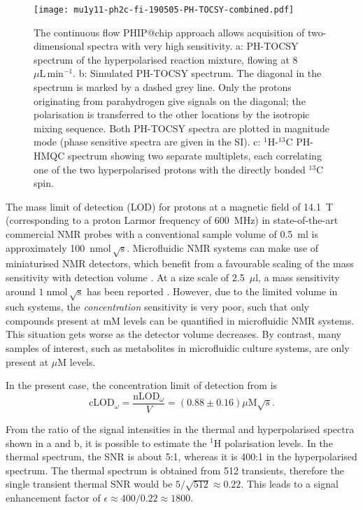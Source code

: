 \begin{figure}
	\centering
	\texttt{[image: mu1y11-ph2c-fi-190505-PH-TOCSY-combined.pdf]}
	\caption{
		The continuous flow PHIP@chip approach allows acquisition of
		two-dimensional spectra with very high sensitivity.
    a: PH-TOCSY spectrum of the hyperpolarised reaction mixture,
		flowing at 8~$\mu\mathrm{L}\,\text{min}^{-1}$.
    b: Simulated PH-TOCSY spectrum. The diagonal in the spectrum is marked by a dashed grey
		line. Only the protons originating from parahydrogen give signals on
		the diagonal; the polarisation is transferred to the other locations by
		the isotropic mixing sequence. Both PH-TOCSY spectra are plotted in
    magnitude mode (phase sensitive spectra are given in the SI).
    c: $^1$H-$^{13}$C PH-HMQC spectrum
		showing two separate multiplets, each correlating one of the two
		hyperpolarised protons with the directly bonded $^{13}$C spin.
}
	\label{fig:PH-TOCSY-HMQC}
\end{figure}

The mass limit of detection (LOD) for
protons at a magnetic field of 14.1~T (corresponding to a proton Larmor frequency
of 600~MHz) in state-of-the-art commercial NMR probes with a
conventional sample volume of 0.5~ml is approximately
100~$\text{nmol}\,\sqrt{\text{s}}$.
Microfluidic NMR systems can make use of miniaturised NMR detectors,
which benefit from a favourable scaling of the mass sensitivity
with detection volume \cite{Olson:1995vu,Badilita:2011td,Zalesskiy:2014hi}. At a size scale
of 2.5~$\mu\mathrm{l}$, a mass sensitivity around
$1\;\text{nmol}\,\sqrt{\text{s}}$
has been reported \cite{Finch:2016gv}.
However, due to the limited volume in such systems,
the \emph{concentration} sensitivity is very poor, such that
only compounds present at mM levels can be quantified
in microfluidic NMR systems. This situation gets worse as the detector
volume decreases. By contrast, many samples of interest, such as
metabolites in microfluidic culture systems, are only present
at $\mu$M levels.

In the present
case, the concentration limit of detection from  is
\begin{equation}
\text{cLOD}_\omega =
\frac{\text{nLOD}_\omega}{V} = (0.88 ± 0.16)\mu\text{M}\sqrt{s}.
\end{equation}

From the ratio of the signal intensities in the thermal and hyperpolarised
spectra shown in a and b, it is possible to estimate the
$\mathrm{^1H}$ polarisation levels. In the thermal spectrum, the SNR is about
5:1, whereas it is 400:1 in the hyperpolarised spectrum. The thermal spectrum is
obtained from 512 transients, therefore the single transient thermal SNR would
be $5/\sqrt{512}\approx 0.22$. This leads to a signal enhancement factor of
$\epsilon\approx 400/0.22 \approx 1800$.

